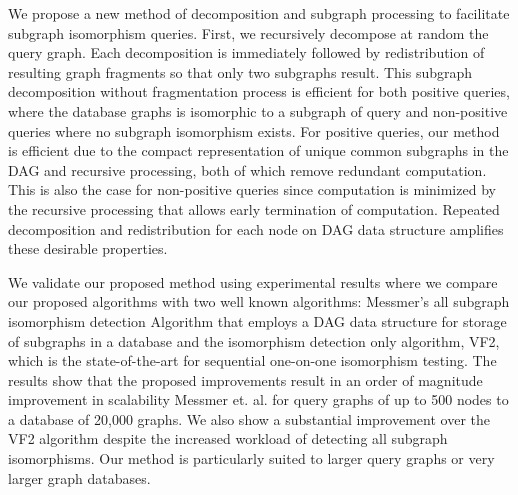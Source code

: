 We propose a new method of decomposition and subgraph processing to facilitate subgraph isomorphism queries. First, we recursively decompose at random  the query graph. Each decomposition is immediately followed by redistribution of resulting graph fragments so that only two subgraphs result. This subgraph decomposition without fragmentation process is efficient for both positive queries, where the database graphs is isomorphic to a subgraph of query and non-positive queries where no subgraph isomorphism exists. For positive queries, our method is efficient due to the compact representation of unique common subgraphs in the DAG  and recursive processing, both of which remove redundant computation. This is also the case for non-positive queries since computation is minimized by the recursive processing that allows early termination of computation. Repeated decomposition and redistribution for each node on DAG data structure amplifies these desirable properties. 


We validate our proposed method using experimental results where we compare our proposed algorithms with two well known algorithms: Messmer's all subgraph isomorphism detection Algorithm that employs a DAG data structure for storage of subgraphs in a database and the isomorphism detection only algorithm, VF2, which is the state-of-the-art for sequential one-on-one isomorphism testing. The results show that the proposed improvements result in an order of magnitude improvement in scalability Messmer et. al. for query graphs of up to 500 nodes to a database of 20,000 graphs. We also show a substantial improvement over the VF2 algorithm despite the increased workload of detecting all subgraph isomorphisms. Our method is particularly suited to larger query graphs or very larger graph databases.

